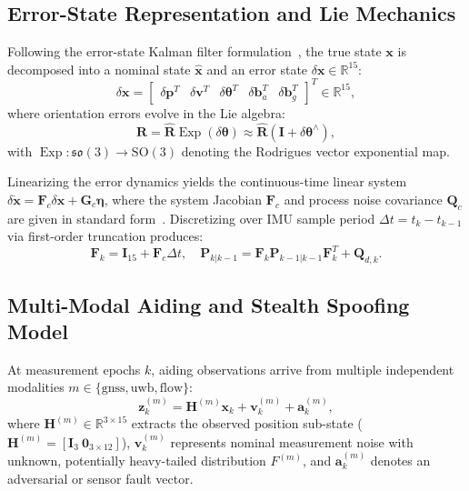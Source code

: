\documentclass[journal,twocolumn]{IEEEtran}
\newcommand{\R}{\mathbb{R}}
\newcommand{\SO}{\mathrm{SO}(3)}
\newcommand{\so}{\mathfrak{so}(3)}
\begin{document}
\subsection{Error-State Representation and Lie Mechanics}
Following the error-state Kalman filter formulation~\cite{sola2018micro}, the true state $\mathbf{x}$ is decomposed into a nominal state $\hat{\mathbf{x}}$ and an error state $\delta \mathbf{x} \in \R^{15}$:
\begin{equation}
    \delta \mathbf{x} = \begin{bmatrix} \delta \mathbf{p}^T & \delta \mathbf{v}^T & \delta \bm{\theta}^T & \delta \mathbf{b}_a^T & \delta \mathbf{b}_g^T \end{bmatrix}^T \in \R^{15},
\end{equation}
where orientation errors evolve in the Lie algebra:
\begin{equation}
    \mathbf{R} = \hat{\mathbf{R}} \operatorname{Exp}(\delta \bm{\theta}) \approx \hat{\mathbf{R}} (\mathbf{I} + \delta \bm{\theta}^\wedge),
\end{equation}
with $\operatorname{Exp}: \so \to \SO$ denoting the Rodrigues vector exponential map.

Linearizing the error dynamics yields the continuous-time linear system $\delta \dot{\mathbf{x}} = \mathbf{F}_c \delta \mathbf{x} + \mathbf{G}_c \bm{\eta}$, where the system Jacobian $\mathbf{F}_c$ and process noise covariance $\mathbf{Q}_c$ are given in standard form~\cite{sola2018micro}. Discretizing over IMU sample period $\Delta t = t_k - t_{k-1}$ via first-order truncation produces:
\begin{equation}
    \mathbf{F}_k = \mathbf{I}_{15} + \mathbf{F}_c \Delta t, \quad \mathbf{P}_{k|k-1} = \mathbf{F}_k \mathbf{P}_{k-1|k-1} \mathbf{F}_k^T + \mathbf{Q}_{d,k}.
\end{equation}

\subsection{Multi-Modal Aiding and Stealth Spoofing Model}
At measurement epochs $k$, aiding observations arrive from multiple independent modalities $m \in \{\text{gnss}, \text{uwb}, \text{flow}\}$:
\begin{equation}
    \mathbf{z}_{k}^{(m)} = \mathbf{H}^{(m)} \mathbf{x}_k + \mathbf{v}_k^{(m)} + \mathbf{a}_k^{(m)},
\end{equation}
where $\mathbf{H}^{(m)} \in \R^{3 \times 15}$ extracts the observed position sub-state ($\mathbf{H}^{(m)} = [\mathbf{I}_3\ \mathbf{0}_{3 \times 12}]$), $\mathbf{v}_k^{(m)}$ represents nominal measurement noise with unknown, potentially heavy-tailed distribution $F^{(m)}$, and $\mathbf{a}_k^{(m)}$ denotes an adversarial or sensor fault vector.
\end{document}
